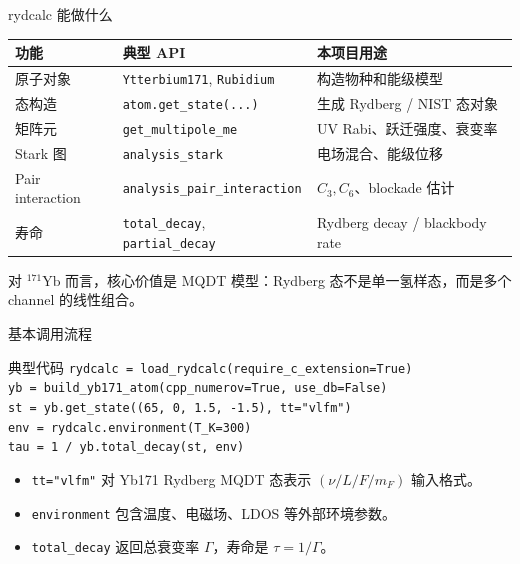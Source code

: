 \documentclass[aspectratio=169,11pt]{ctexbeamer}
\begin{document}
\begin{frame}{rydcalc 能做什么}
  \begin{table}
    \centering
    \small
    \begin{tabular}{lll}
      \toprule
      功能 & 典型 API & 本项目用途 \\
      \midrule
      原子对象 & \texttt{Ytterbium171}, \texttt{Rubidium} & 构造物种和能级模型 \\
      态构造 & \texttt{atom.get\_state(...)} & 生成 Rydberg / NIST 态对象 \\
      矩阵元 & \texttt{get\_multipole\_me} & UV Rabi、跃迁强度、衰变率 \\
      Stark 图 & \texttt{analysis\_stark} & 电场混合、能级位移 \\
      Pair interaction & \texttt{analysis\_pair\_interaction} & \(C_3,C_6\)、blockade 估计 \\
      寿命 & \texttt{total\_decay}, \texttt{partial\_decay} & Rydberg decay / blackbody rate \\
      \bottomrule
    \end{tabular}
  \end{table}

  \vspace{0.5em}
  对 \({}^{171}\mathrm{Yb}\) 而言，核心价值是 MQDT 模型：Rydberg 态不是单一氢样态，而是多个 channel 的线性组合。
\end{frame}

\begin{frame}{基本调用流程}
  \begin{block}{典型代码}
    \small
    \texttt{rydcalc = load\_rydcalc(require\_c\_extension=True)}\\
    \texttt{yb = build\_yb171\_atom(cpp\_numerov=True, use\_db=False)}\\
    \texttt{st = yb.get\_state((65, 0, 1.5, -1.5), tt="vlfm")}\\
    \texttt{env = rydcalc.environment(T\_K=300)}\\
    \texttt{tau = 1 / yb.total\_decay(st, env)}
  \end{block}

  \begin{itemize}
    \item \texttt{tt="vlfm"} 对 Yb171 Rydberg MQDT 态表示 \((\nu/L/F/m_F)\) 输入格式。
    \item \texttt{environment} 包含温度、电磁场、LDOS 等外部环境参数。
    \item \texttt{total\_decay} 返回总衰变率 \(\Gamma\)，寿命是 \(\tau = 1/\Gamma\)。
  \end{itemize}
\end{frame}
\end{document}
